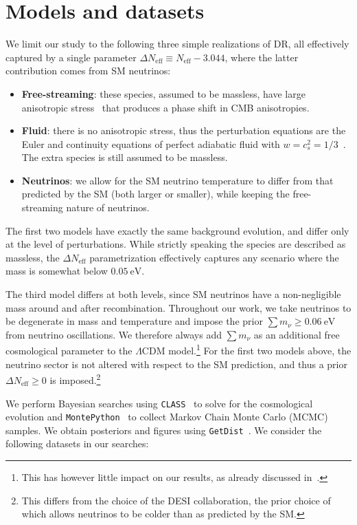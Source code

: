 \documentclass[aps,prd,twocolumn,notitlepage,
superscriptaddress,
nofootinbib,floatfix]{revtex4-2}
\begin{document}
\section{Models and datasets}\label{sec:model}

We limit our study to the following three simple realizations of DR, all effectively captured by a single parameter $\Delta N_\text{eff}\equiv N_\text{eff}-3.044$, where the latter contribution comes from SM neutrinos: 
\begin{itemize}
\item{\textbf{Free-streaming}: these species, assumed to be massless, have large anisotropic stress~\cite{Bashinsky:2003tk} that produces a phase shift in CMB anisotropies.}
\item{\textbf{Fluid}: there is no anisotropic stress, thus the perturbation equations are the Euler and continuity equations of perfect adiabatic fluid with $w=c_s^2=1/3$~\cite{Ma:1995ey}. The extra species is still assumed to be massless.}
\item{\textbf{Neutrinos}: we allow for the SM neutrino temperature to differ from that predicted by the SM (both larger or smaller), while keeping the free-streaming nature of neutrinos.}

\end{itemize}

The first two models have exactly the same background evolution, and differ only at the level of perturbations. While strictly speaking the species are described as massless, the $\Delta N_\text{eff}$ parametrization effectively captures any scenario where the mass is somewhat below $0.05~\text{eV}$.


The third model differs at both levels, since SM neutrinos have a non-negligible mass around and after recombination. Throughout our work, we take neutrinos to be degenerate in mass and temperature and impose the prior $\sum m_\nu\geq 0.06~\text{eV}$ from neutrino oscillations. We therefore always add $\sum m_\nu$ as an additional free cosmological parameter to the $\Lambda$CDM model.\footnote{This has however little impact on our results, as already discussed in~\cite{Planck:2019nip}.} For the first two models above, the neutrino sector is not altered with respect to the SM prediction, and thus a prior $\Delta N_\text{eff}\geq 0$ is imposed.\footnote{This differs from the choice of the DESI collaboration, the prior choice of which allows neutrinos to be colder than as predicted by the SM.}

We perform Bayesian searches using {\tt CLASS}~\cite{Lesgourgues:2011re, Blas:2011rf} to solve for the cosmological evolution and {\tt MontePython}~\cite{Audren:2012wb, Brinckmann:2018cvx} to collect Markov Chain Monte Carlo (MCMC) samples. We obtain posteriors and figures using {\tt GetDist}~\cite{Lewis:2019xzd}. We consider the following datasets in our searches:
\end{document}

